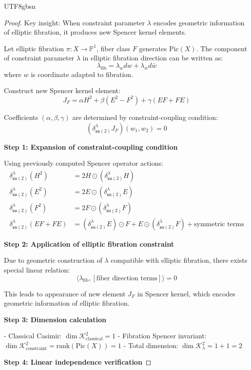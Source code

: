\documentclass[a4paper,12pt]{extarticle}
\theoremstyle{definition}
\begin{document}
\begin{CJK}{UTF8}{gbsn}
\begin{proof}
Key insight: When constraint parameter $\lambda$ encodes geometric information of elliptic fibration, it produces new Spencer kernel elements.

Let elliptic fibration $\pi: X \to \mathbb{P}^1$, fiber class $F$ generates $\text{Pic}(X)$. The component of constraint parameter $\lambda$ in elliptic fibration direction can be written as:
$$\lambda_{\text{fib}} = \lambda_w dw + \lambda_{\bar{w}} d\bar{w}$$
where $w$ is coordinate adapted to fibration.

Construct new Spencer kernel element:
$$J_F = \alpha H^2 + \beta(E^2 - F^2) + \gamma(EF + FE)$$

Coefficients $(\alpha, \beta, \gamma)$ are determined by constraint-coupling condition:
$$(\delta^\lambda_{\mathfrak{su}(2)}J_F)(w_1, w_2) = 0$$

\textbf{Step 1: Expansion of constraint-coupling condition}

Using previously computed Spencer operator actions:
\begin{align}
\delta^\lambda_{\mathfrak{su}(2)}(H^2) &= 2H \odot (\delta^\lambda_{\mathfrak{su}(2)}H)\\
\delta^\lambda_{\mathfrak{su}(2)}(E^2) &= 2E \odot (\delta^\lambda_{\mathfrak{su}(2)}E)\\
\delta^\lambda_{\mathfrak{su}(2)}(F^2) &= 2F \odot (\delta^\lambda_{\mathfrak{su}(2)}F)\\
\delta^\lambda_{\mathfrak{su}(2)}(EF + FE) &= (\delta^\lambda_{\mathfrak{su}(2)}E) \odot F + E \odot (\delta^\lambda_{\mathfrak{su}(2)}F) + \text{symmetric terms}
\end{align}

\textbf{Step 2: Application of elliptic fibration constraint}

Due to geometric construction of $\lambda$ compatible with elliptic fibration, there exists special linear relation:
$$\langle\lambda_{\text{fib}}, [\text{fiber direction terms}]\rangle = 0$$

This leads to appearance of new element $J_F$ in Spencer kernel, which encodes geometric information of elliptic fibration.

\textbf{Step 3: Dimension calculation}

- Classical Casimir: $\dim \mathcal{K}^2_{\text{classical}} = 1$
- Fibration Spencer invariant: $\dim \mathcal{K}^2_{\text{constraint}} = \text{rank}(\text{Pic}(X)) = 1$
- Total dimension: $\dim \mathcal{K}^2_\lambda = 1 + 1 = 2$

\textbf{Step 4: Linear independence verification}


\end{proof}
\end{CJK}
\end{document}
